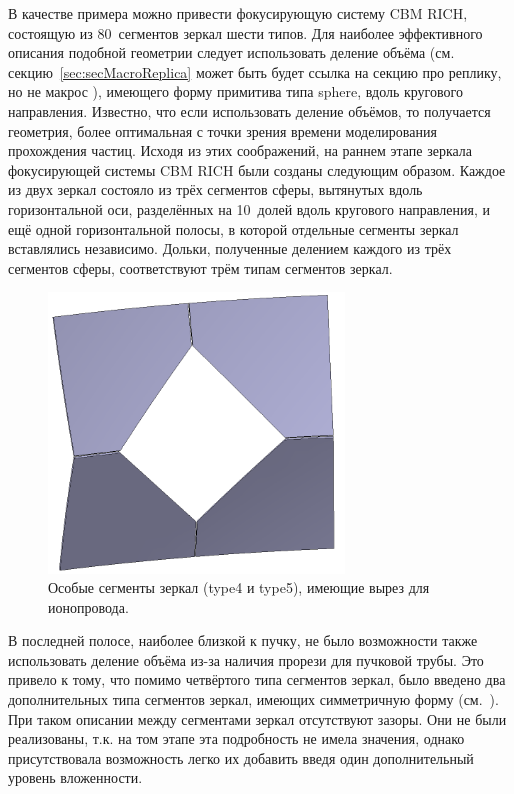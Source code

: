 В качестве примера можно привести фокусирующую систему CBM RICH, состоящую из 80~сегментов зеркал шести типов. Для наиболее эффективного описания подобной геометрии следует использовать деление объёма (см. секцию~\ref{sec:secMacroReplica} \todo может быть будет ссылка на секцию про реплику, но не макрос \todo), имеющего форму примитива типа sphere, вдоль кругового направления. Известно, что если использовать деление объёмов, то получается геометрия, более оптимальная с точки зрения времени моделирования прохождения частиц. Исходя из этих соображений, на раннем этапе зеркала фокусирующей системы CBM RICH были созданы следующим образом. Каждое из двух зеркал состояло из трёх сегментов сферы, вытянутых вдоль горизонтальной оси, разделённых на 10~долей вдоль кругового направления, и ещё одной горизонтальной полосы, в которой отдельные сегменты зеркал вставлялись независимо. Дольки, полученные делением каждого из трёх сегментов сферы, соответствуют трём типам сегментов зеркал. 

\begin{minipage}[t]{0.495\textwidth}
\begin{figure}[H]
\centering
\includegraphics[width=0.7\textwidth]{pictures/Mirror_tiles_special.png}
\caption{Особые сегменты зеркал (type4 и type5), имеющие вырез для ионопровода.}
\label{fig:SpecialMirrorTiles}
\end{figure}
\end{minipage}
\hspace{0.01\textwidth}
\begin{minipage}[t]{0.495\textwidth}
В последней полосе, наиболее близкой к пучку, не было возможности также использовать деление объёма из-за наличия прорези для пучковой трубы. Это привело к тому, что помимо четвёртого типа сегментов зеркал, было введено два дополнительных типа сегментов зеркал, имеющих симметричную форму (см.~). При таком описании между сегментами зеркал отсутствуют зазоры. Они не были реализованы, т.к. на том этапе эта подробность не имела значения, однако присутствовала возможность легко их добавить введя один дополнительный уровень вложенности.
\end{minipage}


